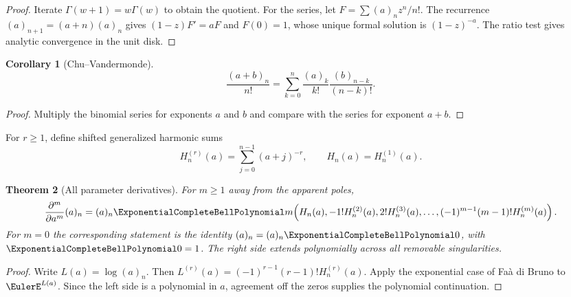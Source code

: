 \documentclass[11pt,a4paper,oneside,openany]{book}
\newtheorem{theorem}{Theorem}[chapter]
\newtheorem{corollary}[theorem]{Corollary}
\theoremstyle{definition}
\theoremstyle{remark}
\begin{document}
\begin{proof}
Iterate $\Gamma(w+1)=w\Gamma(w)$ to obtain the quotient.  For the series, let
$F=\sum(a)_nz^n/n!$.  The recurrence $(a)_{n+1}=(a+n)(a)_n$ gives
$(1-z)F'=aF$ and $F(0)=1$, whose unique formal solution is $(1-z)^{-a}$.
The ratio test gives analytic convergence in the unit disk.
\end{proof}

\begin{corollary}[Chu--Vandermonde]
\begin{equation}
 \frac{(a+b)_n}{n!}=\sum_{k=0}^{n}\frac{(a)_k}{k!}
                         \frac{(b)_{n-k}}{(n-k)!}.                  \label{eq:merged-vandermonde-rising}
\end{equation}
\end{corollary}

\begin{proof}
Multiply the binomial series for exponents $a$ and $b$ and compare with the
series for exponent $a+b$.
\end{proof}

For $r\geq1$, define shifted generalized harmonic sums
\begin{equation}
 H_n^{(r)}(a)=\sum_{j=0}^{n-1}(a+j)^{-r},\qquad H_n(a)=H_n^{(1)}(a). \label{eq:merged-shifted-harmonic}
\end{equation}

\begin{theorem}[All parameter derivatives]
\label{thm:merged-pochhammer-derivatives}
For $m\geq1$ away from the apparent poles,
\begin{equation}
 \frac{\partial^m}{\partial a^m}(a)_n
 =(a)_n\ExponentialCompleteBellPolynomial m\!\left(H_n(a),-1!H_n^{(2)}(a),2!H_n^{(3)}(a),\ldots,
 (-1)^{m-1}(m-1)!H_n^{(m)}(a)\right).                              \label{eq:merged-pochhammer-derivatives}
\end{equation}
For $m=0$ the corresponding statement is the identity
$(a)_n=(a)_n\ExponentialCompleteBellPolynomial0$, with $\ExponentialCompleteBellPolynomial0=1$.  The right side extends
polynomially across all removable singularities.
\end{theorem}

\begin{proof}
Write $L(a)=\log(a)_n$.  Then
$L^{(r)}(a)=(-1)^{r-1}(r-1)!H_n^{(r)}(a)$.  Apply the exponential case of
Faà di Bruno to $\EulerE^{L(a)}$.  Since the left side is a polynomial in $a$,
agreement off the zeros supplies the polynomial continuation.
\end{proof}
\end{document}
